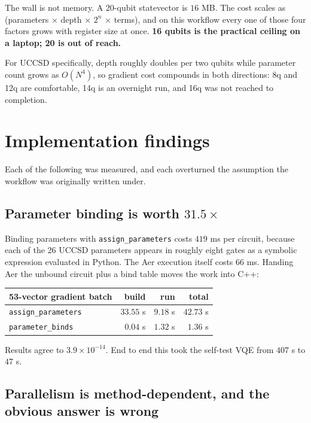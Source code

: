 \documentclass[11pt,a4paper]{article}
\newcommand{\code}[1]{\texttt{\small #1}}
\begin{document}
\begin{result}
The wall is not memory. A 20-qubit statevector is $16$ MB. The cost scales as
(parameters $\times$ depth $\times$ $2^n$ $\times$ terms), and on this workflow
every one of those four factors grows with register size at once. \textbf{16
qubits is the practical ceiling on a laptop; 20 is out of reach.}
\end{result}

For UCCSD specifically, depth roughly doubles per two qubits while parameter
count grows as $O(N^4)$, so gradient cost compounds in both directions: 8q and
12q are comfortable, 14q is an overnight run, and 16q was not reached to
completion.

\section{Implementation findings}

Each of the following was measured, and each overturned the assumption the
workflow was originally written under.

\subsection{Parameter binding is worth $31.5\times$}

Binding parameters with \code{assign\_parameters} costs $419$ ms per circuit,
because each of the 26 UCCSD parameters appears in roughly eight gates as a
symbolic expression evaluated in Python. The Aer execution itself costs $66$ ms.
Handing Aer the unbound circuit plus a bind table moves the work into C++:

\begin{center}
\small
\begin{tabular}{lrrr}
\toprule
53-vector gradient batch & build & run & total \\
\midrule
\code{assign\_parameters} & $33.55$ s & $9.18$ s & $42.73$ s \\
\code{parameter\_binds}   & $0.04$ s  & $1.32$ s & $\mathbf{1.36}$ s \\
\bottomrule
\end{tabular}
\end{center}

Results agree to $3.9\times10^{-14}$. End to end this took the self-test VQE from
$407$ s to $47$ s.

\subsection{Parallelism is method-dependent, and the obvious answer is wrong}
\end{document}
